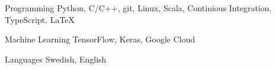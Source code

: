 


\begin{cvskills}


\cvskill
{Programming} %
{Python, C/C++, git, Linux, Scala, Continious Integration, TypeScript, LaTeX} %


\cvskill
{Machine Learning } %
{TensorFlow, Keras, Google Cloud} %


\cvskill
{Languages} %
{Swedish, English } %


\end{cvskills}
